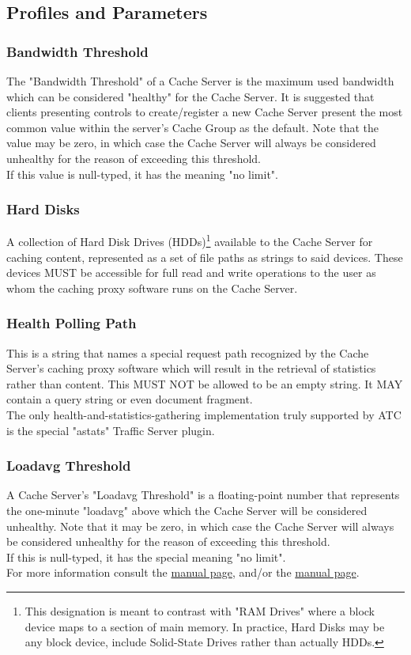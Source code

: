 \subsection{Profiles and Parameters}


\subsubsection{Bandwidth Threshold}
The "Bandwidth Threshold" of a Cache Server is the maximum used bandwidth which
can be considered "healthy" for the Cache Server. It is suggested that clients
presenting controls to create/register a new Cache Server present the most
common value within the server's Cache Group as the default. Note that the value
may be zero, in which case the Cache Server will always be considered unhealthy
for the reason of exceeding this threshold.\\
If this value is null-typed, it has the meaning "no limit".

\subsubsection{Hard Disks}
A collection of Hard Disk Drives (HDDs)\footnote{This designation is meant to
contrast with "RAM Drives" where a block device maps to a section of main
memory. In practice, Hard Disks may be any block device, include Solid-State
Drives rather than actually HDDs.} available to the Cache Server for caching
content, represented as a set of file paths as strings to said devices. These
devices MUST be accessible for full read and write operations to the user as
whom the caching proxy software runs on the Cache Server.

\subsubsection{Health Polling Path}
This is a string that names a special request path recognized by the Cache
Server's caching proxy software which will result in the retrieval of statistics
rather than content. This MUST NOT be allowed to be an empty string. It MAY
contain a query string or even document fragment.\\
The only health-and-statistics-gathering implementation truly supported by ATC
is the special "astats" Traffic Server plugin.

\subsubsection{Loadavg Threshold}
A Cache Server's "Loadavg Threshold" is a floating-point number that represents
the one-minute "loadavg" above which the Cache Server will be considered
unhealthy. Note that it may be zero, in which case the Cache Server will always
be considered unhealthy for the reason of exceeding this threshold.\\
If this is null-typed, it has the special meaning "no limit".\\
For more information consult the
\href{https://linux.die.net/man/3/getloadavg}{ manual page},
and/or the
\href{https://linux.die.net/man/5/proc}{ manual page}.

